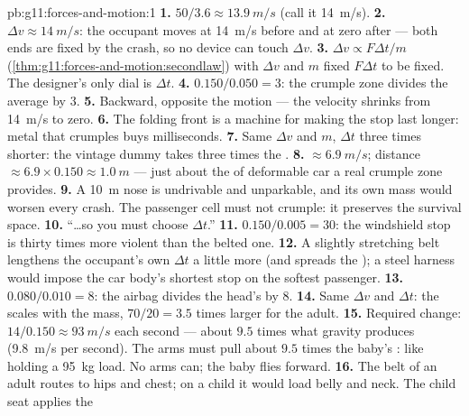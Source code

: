 \begin{solution}{pb:g11:forces-and-motion:1}
\textbf{1.} $50/3.6 \approx \qty{13.9}{m/s}$ (call it \qty{14}{m/s}).
\textbf{2.} $\Delta v \approx \qty{14}{m/s}$: the occupant moves at
\qty{14}{m/s} before and at zero after --- both ends are fixed by the
crash, so no device can touch $\Delta v$.
\textbf{3.} $\Delta v \propto F\Delta t/m$
(\cref{thm:g11:forces-and-motion:secondlaw}) with $\Delta v$ and $m$
fixed  $F\Delta t$ to be fixed. The designer's only dial is
$\Delta t$.
\textbf{4.} $0.150/0.050 = 3$: the crumple zone divides the average
 by $3$.
\textbf{5.} Backward, opposite the motion --- the velocity shrinks from
\qty{14}{m/s} to zero.
\textbf{6.} The folding front is a machine for making the stop last
longer: metal that crumples buys milliseconds.
\textbf{7.} Same $\Delta v$ and $m$, $\Delta t$ three times shorter:
the vintage dummy takes three times the .
\textbf{8.}  $\approx \qty{6.9}{m/s}$; distance $\approx
6.9 \times 0.150 \approx \qty{1.0}{m}$ --- just about the  of
deformable car a real crumple zone provides.
\textbf{9.} A \qty{10}{m} nose is undrivable and unparkable, and its
own mass would worsen every crash. The passenger cell must not
crumple: it preserves the survival space.
\textbf{10.} ``\dots so you must choose $\Delta t$.''
\textbf{11.} $0.150/0.005 = 30$: the windshield stop is thirty times
more violent than the belted one.
\textbf{12.} A slightly stretching belt lengthens the occupant's own
$\Delta t$ a little more (and spreads the ); a steel harness
would impose the car body's shortest stop on the softest passenger.
\textbf{13.} $0.080/0.010 = 8$: the airbag divides the head's  by
$8$.
\textbf{14.} Same $\Delta v$ and $\Delta t$: the  scales with the
mass, $70/20 = 3.5$ times larger for the adult.
\textbf{15.} Required change: $14/0.150 \approx \qty{93}{m/s}$ each
second --- about $9.5$ times what gravity produces
(\qty{9.8}{m/s} per second). The arms must pull about $9.5$ times the
baby's : like holding a \qty{95}{kg} load. No arms can; the baby
flies forward.
\textbf{16.} The belt of an adult routes  to hips and chest; on a
child it would load belly and neck. The child seat applies the

\end{solution}
